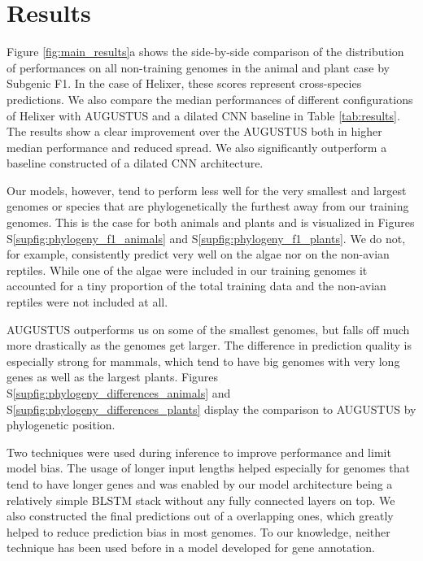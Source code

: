 \documentclass{bioinfo}
\newcounter{supfig}
\begin{document}
\section{Results}
Figure \ref{fig:main_results}a shows the side-by-side comparison of the distribution 
of performances on all non-training genomes in the animal and plant case by Subgenic 
F1. In the case of Helixer, these scores represent cross-species predictions. We 
also compare the median performances of different configurations of Helixer with 
AUGUSTUS and a dilated CNN baseline in Table \ref{tab:results}. The results show a 
clear improvement over the AUGUSTUS both in higher median performance and reduced spread. We also 
significantly outperform a baseline constructed of a dilated CNN architecture.

Our models, however, tend to perform less well for the very smallest and largest 
genomes or species that are phylogenetically the furthest away from our training 
genomes. This is the case for both animals and plants and is visualized in
Figures S\ref{supfig:phylogeny_f1_animals} and S\ref{supfig:phylogeny_f1_plants}. 
We do not, for example, consistently predict very well on the 
algae nor on the non-avian reptiles. While one of the algae were included 
in our training genomes it accounted for a tiny proportion of the total training 
data and the non-avian reptiles were not included at all.
 
AUGUSTUS outperforms us on some of the smallest genomes, but falls off much more 
drastically as the genomes get larger. The difference in prediction quality is 
especially strong for mammals, which tend to have big genomes with very long genes 
as well as the largest plants. Figures S\ref{supfig:phylogeny_differences_animals} 
and S\ref{supfig:phylogeny_differences_plants} display the comparison to AUGUSTUS 
by phylogenetic position.

Two techniques were used during inference to improve performance and limit model 
bias. The usage of longer input lengths helped especially for genomes that tend to 
have longer genes and was enabled by our model architecture being a relatively 
simple BLSTM stack without any fully connected layers on top. We also constructed the 
final predictions out of a overlapping ones, which greatly helped to reduce 
prediction bias in most genomes. To our knowledge, neither technique has been used 
before in a model developed for gene annotation. 
\end{document}
